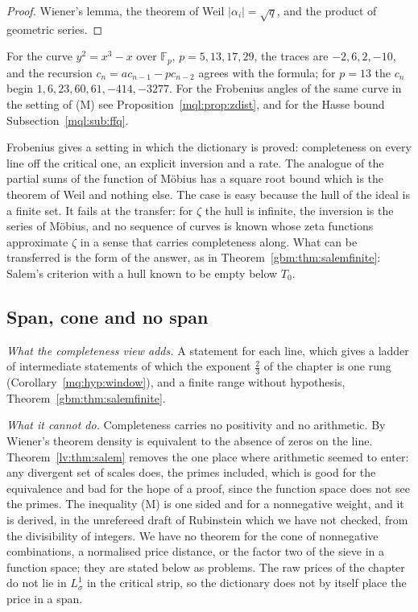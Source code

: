 \begin{proof}
Wiener's lemma, the theorem of Weil $|\alpha_i|=\sqrt q$, and the product of geometric series.
\end{proof}

For the curve $y^2=x^3-x$ over $\mathbb F_p$, $p=5,13,17,29$, the traces are $-2,6,2,-10$, and the recursion $c_n=ac_{n-1}-pc_{n-2}$ agrees with the formula; for $p=13$ the $c_n$ begin $1,6,23,60,61,-414,-3277$. For the Frobenius angles of the same curve in the setting of (M) see Proposition~\ref{mql:prop:zdist}, and for the Hasse bound Subsection~\ref{mql:sub:ffq}.

Frobenius gives a setting in which the dictionary is proved: completeness on every line off the critical one, an explicit inversion and a rate. The analogue of the partial sums of the function of M\"obius has a square root bound which is the theorem of Weil and nothing else. The case is easy because the hull of the ideal is a finite set. It fails at the transfer: for $\zeta$ the hull is infinite, the inversion is the series of M\"obius, and no sequence of curves is known whose zeta functions approximate $\zeta$ in a sense that carries completeness along. What can be transferred is the form of the answer, as in Theorem~\ref{gbm:thm:salemfinite}: Salem's criterion with a hull known to be empty below $T_0$.

\subsection{Span, cone and no span}

\emph{What the completeness view adds.} A statement for each line, which gives a ladder of intermediate statements of which the exponent $\frac23$ of the chapter is one rung (Corollary~\ref{mq:hyp:window}), and a finite range without hypothesis, Theorem~\ref{gbm:thm:salemfinite}.

\emph{What it cannot do.} Completeness carries no positivity and no arithmetic. By Wiener's theorem density is equivalent to the absence of zeros on the line. Theorem~\ref{lv:thm:salem} removes the one place where arithmetic seemed to enter: any divergent set of scales does, the primes included, which is good for the equivalence and bad for the hope of a proof, since the function space does not see the primes. The inequality (M) is one sided and for a nonnegative weight, and it is derived, in the unrefereed draft of Rubinstein \cite{Rub26} which we have not checked, from the divisibility of integers. We have no theorem for the cone of nonnegative combinations, a normalised price distance, or the factor two of the sieve in a function space; they are stated below as problems. The raw prices of the chapter do not lie in $L^1_\sigma$ in the critical strip, so the dictionary does not by itself place the price in a span.

